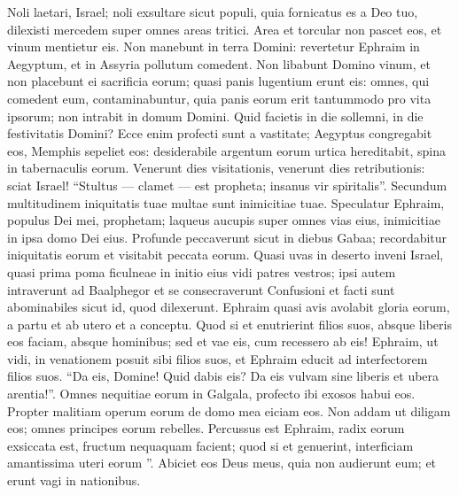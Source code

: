 \begin{biblechapter}
\begin{biblechapter}
\begin{biblechapter}
\begin{biblechapter}
\begin{biblechapter}
\begin{biblechapter}
\begin{biblechapter}
\begin{biblechapter}
\begin{biblechapter}
 \verse Noli laetari, Israel;
 noli exsultare sicut populi,
 quia fornicatus es a Deo tuo,
 dilexisti mercedem super omnes areas tritici.
 \verse Area et torcular non pascet eos,
 et vinum mentietur eis.
 \verse Non manebunt in terra Domini:
 revertetur Ephraim in Aegyptum,
 et in Assyria pollutum comedent.
 \verse Non libabunt Domino vinum,
 et non placebunt ei sacrificia eorum;
 quasi panis lugentium erunt eis:
 omnes, qui comedent eum, contaminabuntur,
 quia panis eorum erit tantummodo pro vita ipsorum;
 non intrabit in domum Domini.
 \verse Quid facietis in die sollemni,
 in die festivitatis Domini?
 \verse Ecce enim profecti sunt a vastitate;
 Aegyptus congregabit eos,
 Memphis sepeliet eos:
 desiderabile argentum eorum
 urtica hereditabit,
 spina in tabernaculis eorum.
 \verse Venerunt dies visitationis,
 venerunt dies retributionis:
 sciat Israel!
 “Stultus — clamet — est propheta;
 insanus vir spiritalis”.
 Secundum multitudinem iniquitatis tuae
 multae sunt inimicitiae tuae.
 \verse Speculatur Ephraim, populus Dei mei, prophetam;
 laqueus aucupis super omnes vias eius,
 inimicitiae in ipsa domo Dei eius.
 \verse Profunde peccaverunt
 sicut in diebus Gabaa;
 recordabitur iniquitatis eorum
 et visitabit peccata eorum.
 \verse Quasi uvas in deserto
 inveni Israel,
 quasi prima poma ficulneae in initio eius
 vidi patres vestros;
 ipsi autem intraverunt ad Baalphegor
 et se consecraverunt Confusioni
 et facti sunt abominabiles
 sicut id, quod dilexerunt.
 \verse Ephraim quasi avis avolabit gloria eorum,
 a partu et ab utero et a conceptu.
 \verse Quod si et enutrierint filios suos,
 absque liberis eos faciam, absque hominibus;
 sed et vae eis,
 cum recessero ab eis!
 \verse Ephraim, ut vidi, in venationem posuit sibi filios suos,
 et Ephraim educit ad interfectorem filios suos.
 \verse “Da eis, Domine! Quid dabis eis?
 Da eis vulvam sine liberis et ubera arentia!”.
 \verse Omnes nequitiae eorum in Galgala,
 profecto ibi exosos habui eos.
 Propter malitiam operum eorum
 de domo mea eiciam eos.
 Non addam ut diligam eos;
 omnes principes eorum rebelles.
 \verse Percussus est Ephraim,
 radix eorum exsiccata est,
 fructum nequaquam facient;
 quod si et genuerint,
 interficiam amantissima uteri eorum ”.
 \verse Abiciet eos Deus meus,
 quia non audierunt eum;
 et erunt vagi in nationibus.
 

\end{biblechapter}
\end{biblechapter}
\end{biblechapter}
\end{biblechapter}
\end{biblechapter}
\end{biblechapter}
\end{biblechapter}
\end{biblechapter}
\end{biblechapter}
